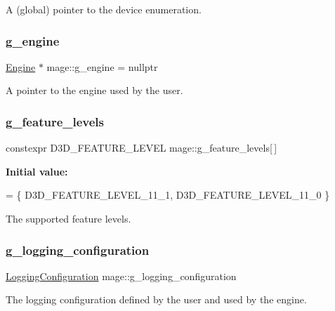 A (global) pointer to the device enumeration. \hypertarget{namespacemage_a84bf83f1e8779d884452cdf08f56c19a}{}\label{namespacemage_a84bf83f1e8779d884452cdf08f56c19a} 
\subsubsection{\texorpdfstring{g\+\_\+engine}{g\_engine}}
{\footnotesize\ttfamily \hyperlink{classmage_1_1_engine}{Engine} $\ast$ mage\+::g\+\_\+engine = nullptr}

A pointer to the engine used by the user. \hypertarget{namespacemage_a5364918c7bf234d90d3b111e46ade7f9}{}\label{namespacemage_a5364918c7bf234d90d3b111e46ade7f9} 
\subsubsection{\texorpdfstring{g\+\_\+feature\+\_\+levels}{g\_feature\_levels}}
{\footnotesize\ttfamily constexpr D3\+D\+\_\+\+F\+E\+A\+T\+U\+R\+E\+\_\+\+L\+E\+V\+EL mage\+::g\+\_\+feature\+\_\+levels\mbox{[}$\,$\mbox{]}}

{\bfseries Initial value\+:}
\begin{DoxyCode}
= \{
        D3D\_FEATURE\_LEVEL\_11\_1,
        D3D\_FEATURE\_LEVEL\_11\_0
    \}
\end{DoxyCode}
The supported feature levels. \hypertarget{namespacemage_a162413669f92d91c7ee135d60f93fcf1}{}\label{namespacemage_a162413669f92d91c7ee135d60f93fcf1} 
\subsubsection{\texorpdfstring{g\+\_\+logging\+\_\+configuration}{g\_logging\_configuration}}
{\footnotesize\ttfamily \hyperlink{structmage_1_1_logging_configuration}{Logging\+Configuration} mage\+::g\+\_\+logging\+\_\+configuration}

The logging configuration defined by the user and used by the engine. \hypertarget{namespacemage_ac3539f0d753ebffaf8167da33e0d97b2}{}\label{namespacemage_ac3539f0d753ebffaf8167da33e0d97b2} 
